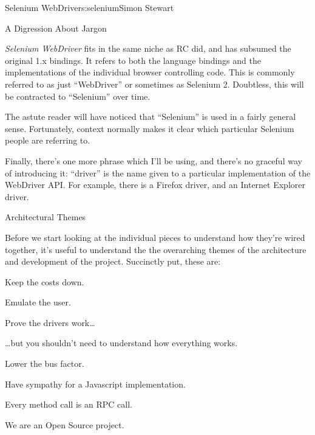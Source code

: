 \begin{aosachapter}{Selenium WebDriver}{s:selenium}{Simon Stewart}
\begin{aosasect1}{A Digression About Jargon}
\begin{aosaitemize}
  \item \emph{Selenium WebDriver} fits in the same niche as RC did, and has subsumed
  the original 1.x bindings.  It refers to both the language bindings
  and the implementations of the individual browser controlling
  code. This is commonly referred to as just ``WebDriver'' or sometimes
  as Selenium 2. Doubtless, this will be contracted to ``Selenium'' over
  time.

\end{aosaitemize}

The astute reader will have noticed that ``Selenium'' is used in a
fairly general sense. Fortunately, context normally makes it clear
which particular Selenium people are referring to.

Finally, there's one more phrase which I'll be using, and there's no
graceful way of introducing it: ``driver'' is the name given to a
particular implementation of the WebDriver API\@. For example, there is
a Firefox driver, and an Internet Explorer driver.

\end{aosasect1}

\begin{aosasect1}{Architectural Themes}

Before we start looking at the individual pieces to understand how
they're wired together, it's useful to understand the the overarching
themes of the architecture and development of the project. Succinctly
put, these are:

\begin{aosaitemize}

\item Keep the costs down.

\item Emulate the user.

\item Prove the drivers work{\ldots}

\item {\ldots}but you shouldn't need to understand how everything works.

\item Lower the bus factor.

\item Have sympathy for a Javascript implementation.

\item Every method call is an RPC call.

\item We are an Open Source project.


\end{aosaitemize}
\end{aosasect1}
\end{aosachapter}
